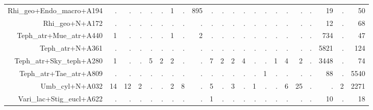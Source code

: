\documentclass[a4paper, 11]{article}\usepackage[]{graphicx}\usepackage[]{color}
\begin{document}
\begin{table}
\begin{tabular}{rrrrrrrrrrrrrrrrrrrrrr}
  Rhi\_geo+Endo\_macro+A194 & . & . & . & . & . & 1 & . & 895 & . & . & . & . & . & . & . & . & . & . & 19 & . & 50 \\ 
  Rhi\_geo+N+A172 & . & . & . & . & . & . & . & . & . & . & . & . & . & . & . & . & . & . & 12 & . & 68 \\ 
  Teph\_atr+Mue\_atr+A440 & 1 & . & . & . & . & 1 & . & 2 & . & . & . & . & . & . & . & . & . & . & 734 & . & 47 \\ 
  Teph\_atr+N+A361 & . & . & . & . & . & . & . & . & . & . & . & . & . & . & . & . & . & . & 5821 & . & 124 \\ 
  Teph\_atr+Sky\_teph+A280 & 1 & . & . & 5 & 2 & 2 & . & . & 7 & 2 & 2 & 4 & . & . & 1 & 4 & 2 & . & 3448 & . & 74 \\ 
  Teph\_atr+Tae\_atr+A809 & . & . & . & . & . & . & . & . & . & . & . & . & . & 1 & . & . & . & . & 88 & . & 5540 \\ 
  Umb\_cyl+N+A032 & 14 & 12 & 2 & . & . & 2 & 8 & . & 5 & . & 3 & . & 1 & . & . & 6 & 25 & . & . & 2 & 2271 \\ 
  Vari\_lac+Stig\_eucl+A622 & . & . & . & . & . & . & . & . & 1 & . & . & . & . & . & . & . & . & . & 10 & . & 18 \\ 
   \hline
\end{tabular}
\end{table}
\end{document}
